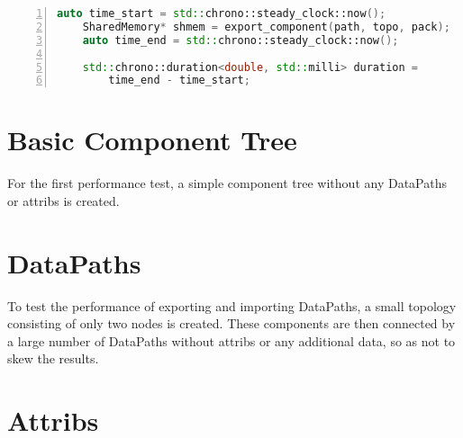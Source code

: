 \begin{lstlisting}[language=c++, numbers=left, caption= Measuring the Execution Time, captionpos=b, label={lst:perf_code}]
    auto time_start = std::chrono::steady_clock::now();
    SharedMemory* shmem = export_component(path, topo, pack);
    auto time_end = std::chrono::steady_clock::now();

    std::chrono::duration<double, std::milli> duration =
        time_end - time_start;
\end{lstlisting}

\section{Basic Component Tree}
For the first performance test, a simple component tree without any DataPaths or attribs is created.

\section{DataPaths}
To test the performance of exporting and importing DataPaths, a small topology consisting of only two nodes is created.
These components are then connected by a large number of DataPaths without attribs or any additional data, so as not to skew the results.

\section{Attribs}